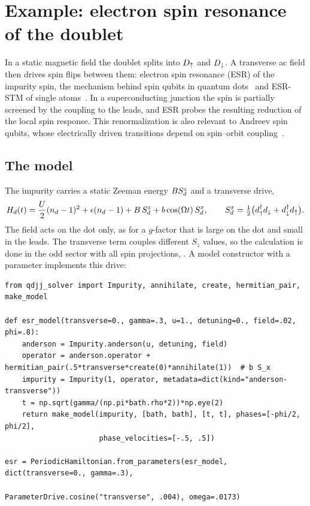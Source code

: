 \chapter{Example: electron spin resonance of the doublet}\label{ch:ex-esr}

In a static magnetic field the doublet splits into $D_{\uparrow}$ and $D_{\downarrow}$. A transverse ac field
then drives spin flips between them: electron spin resonance (ESR) of the impurity spin, the
mechanism behind spin qubits in quantum dots~\cite{koppens2006driven,nowack2007coherent,golovach2006electricdipoleinduced}
and ESR-STM of single atoms~\cite{baumann2015electron,willke2018probing,yang2019coherent}. In
a superconducting junction the spin is partially screened by the coupling to the leads, and
ESR probes the resulting reduction of the local spin response. This renormalization
is also relevant to Andreev spin qubits, whose electrically driven transitions
depend on spin--orbit coupling~\cite{chtchelkatchev2003andreev,park2017andreev,hays2021coherent,pitavidal2023direct,bargerbos2023spectroscopy}.

\section{The model}

The impurity carries a static Zeeman energy $BS^z_d$ and a transverse drive,
\begin{equation}
  H_{d}(t)=\frac U2(n_d-1)^2+\epsilon(n_d-1)+B\,S^z_d+b\cos(\Omega t)\,S^x_d,\qquad
  S^x_d=\tfrac12\bigl(d_{\uparrow}^\dagger d_{\downarrow}+d_{\downarrow}^\dagger d_{\uparrow}\bigr).
\end{equation}
The field acts on the dot only, as for a $g$-factor that is large on the dot and small in the
leads. The transverse term couples different $S_z$ values, so the calculation is done in the odd
sector with all spin projections, . A model constructor with a
 parameter implements this drive:

\begin{lstlisting}
from qdjj_solver import Impurity, annihilate, create, hermitian_pair, make_model

def esr_model(transverse=0., gamma=.3, u=1., detuning=0., field=.02, phi=.8):
    anderson = Impurity.anderson(u, detuning, field)
    operator = anderson.operator + hermitian_pair(.5*transverse*create(0)*annihilate(1))  # b S_x
    impurity = Impurity(1, operator, metadata=dict(kind="anderson-transverse"))
    t = np.sqrt(gamma/(np.pi*bath.rho*2))*np.eye(2)
    return make_model(impurity, [bath, bath], [t, t], phases=[-phi/2, phi/2],
                      phase_velocities=[-.5, .5])

esr = PeriodicHamiltonian.from_parameters(esr_model, dict(transverse=0., gamma=.3),
                                          ParameterDrive.cosine("transverse", .004), omega=.0173)
\end{lstlisting}

